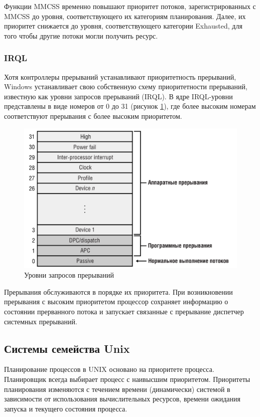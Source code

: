 \documentclass[14pt]{extarticle}
\begin{document}
Функции MMCSS временно повышают приоритет потоков, зарегистрированных с MMCSS
до уровня, соответствующего их категориям планирования. Далее, их приоритет
снижается до уровня, соответствующего категории Exhausted, для того чтобы
другие потоки могли получить ресурс.

\subsubsection{IRQL}

Хотя контроллеры прерываний устанавливают приоритетность прерываний, Windows
устанавливает свою собственную схему приоритетности прерываний, известную как
уровни запросов прерываний (IRQL). В ядре IRQL-уровни представлены в виде
номеров от 0 до 31 (рисунок \ref{fig:irql}), где более высоким номерам
соответствуют прерывания с более высоким приоритетом.

\begin{figure}[h]
    \centering
    \includegraphics[width=0.90\linewidth]{resources/irql.png}
    \caption{Уровни запросов прерываний}
    \label{fig:irql}
\end{figure}

Прерывания обслуживаются в порядке их приоритета. При возникновении прерывания
с высоким приоритетом процессор сохраняет информацию о состоянии прерванного
потока и запускает связанные с прерывание диспетчер системных прерываний.

\subsection{Системы семейства Unix}

Планирование процессов в UNIX основано на приоритете процесса. Планировщик
всегда выбирает процесс с наивысшим приоритетом. Приоритеты планирования
изменяются с течением времени (динамически) системой в зависимости от
использования вычислительных ресурсов, времени ожидания запуска и текущего
состояния процесса. 
\end{document}

